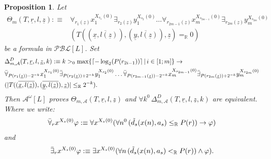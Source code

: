 \documentclass[11pt]{amsart}
\newtheorem{proposition}[theorem]{Proposition}
\theoremstyle{definition}
\theoremstyle{remark}
\DeclarePairedDelimiter{\ceil}{\lceil}{\rceil}
\def\RR{\mathbb{R}}
\begin{document}
\begin{proposition}
\label{prop:equiv:dual}
    Let
\begin{align*}
    \Theta_m(T,\underline{r},l,\underline{z}):\equiv &\forall_{r_1(\underline{z})} x_1^{X_{s_1}(0)} \exists_{r_2(\underline{z})} y_1^{X_{s_2}(0)} \ldots \forall_{r_{2m-1}(\underline{z})} x_m^{X_{s_{2m-1}}(0)}\exists_{r_{2m}(\underline{z})} y_m^{X_{s_{2m}}(0)}\\&(T((\overline{\underline{x},l(\underline{z})}),(\overline{\underline{y},l(\underline{z})}),\underline{z})=_\RR 0)
\end{align*}
be a formula in $\mathcal{PBL}[L]$. Set 
\begin{align*}
          &\Delta^D_{m,\mathcal{A}}(T,\underline{r},l,\underline{z},k):\equiv k>_0\max\{\ceil{-\log_2(P(r_{2i-1}))}\,|\, i \in [1;m]\} \to\\ &\Bar{\forall}_{P(r_1(\underline{z}))-2^{-k}} x_1^{X_{s_1}(0)} \Bar{\exists}_{P(r_2(\underline{z}))+2^{-k}} y_1^{X_{s_2}(0)} \ldots \Bar{\forall}_{P(r_{2m-1}(\underline{z}))-2^{-k}} x_m^{X_{s_{2m-1}}(0)}\Bar{\exists}_{P(r_{2m}(\underline{z}))+2^{-k}} y_m^{X_{s_{2m}}(0)}\\&(|T((\overline{\underline{x},l(\underline{z})}),(\overline{\underline{y},l(\underline{z})}),\underline{z})|\le_\RR 2^{-k}).
    \end{align*}
    Then $\mathcal{A}^\omega[L]$ proves $\Theta_{m,\mathcal{A}}(T,\underline{r},l,\underline{z})$ and $\forall k^0\,\Delta^D_{m,\mathcal{A}}(T,\underline{r},l,\underline{z},k)$ are equivalent. Where we write:
\[ 
\Bar{\forall}_rx^{X_s(0)}\varphi:\equiv\forall x^{X_s(0)}(\forall n^0\,(\Tilde{d_s}(x(n),a_s)\le_\RR P(r))\to \varphi)
\]
and 
\[
\Bar{\exists}_rx^{X_s(0)}\varphi:\equiv \exists x^{X_s(0)}(\forall n\, (\Tilde{d_s}(x(n),a_s)<_\RR P(r))\land \varphi).
\]
\end{proposition}
\end{document}
